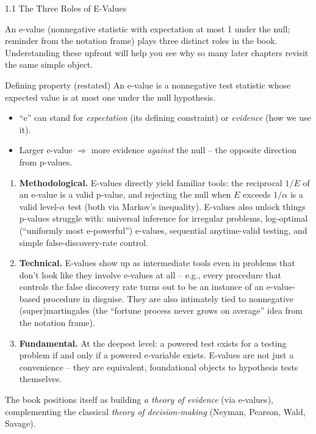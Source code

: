 \documentclass[aspectratio=169,10pt]{beamer}
\begin{document}
\begin{frame}[allowframebreaks]{1.1 The Three Roles of E-Values}

An e-value (nonnegative statistic with expectation at most 1 under the
null; reminder from the notation frame) plays three distinct roles in the
book. Understanding these upfront will help you see why so many later
chapters revisit the same simple object.

\begin{block}{Defining property (restated)}
An e-value is a nonnegative test statistic whose expected value is at
most one under the null hypothesis.
\begin{itemize}
  \item ``e'' can stand for \emph{expectation} (its defining constraint) or
    \emph{evidence} (how we use it).
  \item Larger e-value $\Rightarrow$ more evidence \emph{against} the null
    -- the opposite direction from p-values.
\end{itemize}
\end{block}

\framebreak

\begin{enumerate}
  \item \textbf{Methodological.} E-values directly yield familiar tools:
    the reciprocal $1/E$ of an e-value is a valid p-value, and rejecting
    the null when $E$ exceeds $1/\alpha$ is a valid level-$\alpha$ test
    (both via Markov's inequality). E-values also unlock things p-values
    struggle with: universal inference for irregular problems, log-optimal
    (``uniformly most e-powerful'') e-values, sequential anytime-valid
    testing, and simple false-discovery-rate control.
  \item \textbf{Technical.} E-values show up as intermediate tools even in
    problems that don't look like they involve e-values at all -- e.g.,
    every procedure that controls the false discovery rate turns out to be
    an instance of an e-value-based procedure in disguise. They are also
    intimately tied to nonnegative (super)martingales (the ``fortune
    process never grows on average'' idea from the notation frame).
  \item \textbf{Fundamental.} At the deepest level: a powered test exists
    for a testing problem if and only if a powered e-variable exists.
    E-values are not just a convenience -- they are equivalent, foundational
    objects to hypothesis tests themselves.
\end{enumerate}

\vspace{0.3em}
The book positions itself as building \emph{a theory of evidence} (via
e-values), complementing the classical \emph{theory of decision-making}
(Neyman, Pearson, Wald, Savage).

\end{frame}
\end{document}
